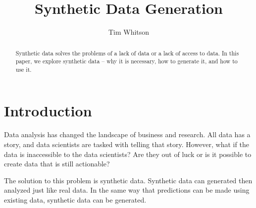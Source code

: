 
\title{Synthetic Data Generation}

\author{Tim Whitson}

\renewcommand{\shortauthors}{T. Whitson}

\begin{abstract}
Synthetic data solves the problems of a lack of data or a lack of access to data. In this paper, we explore synthetic data -- why it is necessary, how to generate it, and how to use it.
\end{abstract}


\maketitle

\section{Introduction}

Data analysis has changed the landscape of business and research. All data has a story, and data scientists are tasked with telling that story. However, what if the data is inaccessible to the data scientists? Are they out of luck or is it possible to create data that is still actionable?

The solution to this problem is synthetic data. Synthetic data can generated then analyzed just like real data. In the same way that predictions can be made using existing data, synthetic data can be generated.




 


